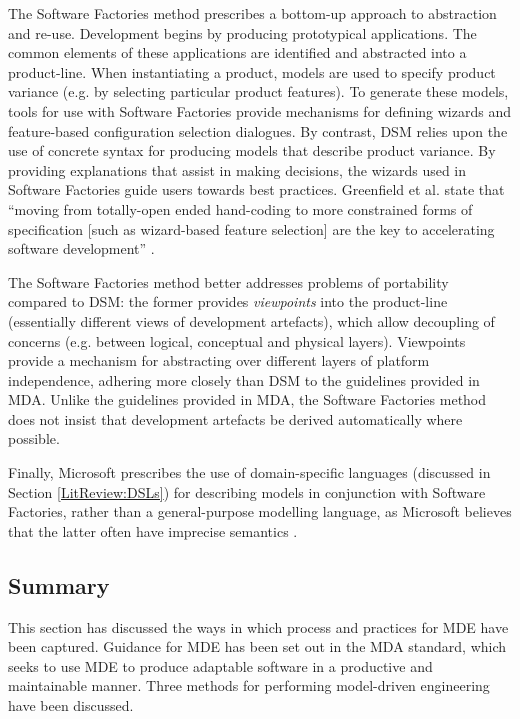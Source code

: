The Software Factories method \cite{greenfield04software} prescribes a bottom-up approach to abstraction and re-use. Development begins by producing prototypical applications. The common elements of these applications are identified and abstracted into a product-line. When instantiating a product, models are used to specify product variance (e.g. by selecting particular product features). To generate these models, tools for use with Software Factories provide mechanisms for defining wizards and feature-based configuration selection dialogues. By contrast, DSM relies upon the use of concrete syntax for producing models that describe product variance. By providing explanations that assist in making decisions, the wizards used in Software Factories guide users towards best practices. Greenfield et al. state that ``moving from totally-open ended hand-coding to more constrained forms of specification [such as wizard-based feature selection] are the key to accelerating software development'' \cite[pg179]{greenfield04software}.

The Software Factories method better addresses problems of portability compared to DSM: the former provides \textit{viewpoints} into the product-line (essentially different views of development artefacts), which allow decoupling of concerns (e.g. between logical, conceptual and physical layers). Viewpoints provide a mechanism for abstracting over different layers of platform independence, adhering more closely than DSM to the guidelines provided in MDA. Unlike the guidelines provided in MDA, the Software Factories method does not insist that development artefacts be derived automatically where possible.

Finally, Microsoft prescribes the use of domain-specific languages (discussed in Section \ref{LitReview:DSLs}) for describing models in conjunction with Software Factories, rather than a general-purpose modelling language, as Microsoft believes that the latter often have imprecise semantics \cite{greenfield04software}.

\subsection{Summary}
This section has discussed the ways in which process and practices for MDE have been captured. Guidance for MDE has been set out in the MDA standard, which seeks to use MDE to produce adaptable software in a productive and maintainable manner. Three methods for performing model-driven engineering have been discussed.
 
